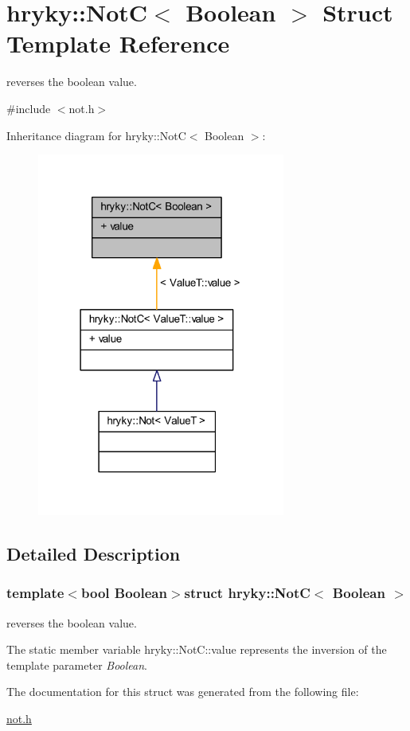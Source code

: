 \hypertarget{structhryky_1_1_not_c}{\section{hryky\-:\-:Not\-C$<$ Boolean $>$ Struct Template Reference}
\label{structhryky_1_1_not_c}
}


reverses the boolean value.  




{\ttfamily \#include $<$not.\-h$>$}



Inheritance diagram for hryky\-:\-:Not\-C$<$ Boolean $>$\-:\nopagebreak
\begin{figure}[H]
\begin{center}
\leavevmode
\includegraphics[width=231pt]{structhryky_1_1_not_c__inherit__graph}
\end{center}
\end{figure}


\subsection{Detailed Description}
\subsubsection*{template$<$bool Boolean$>$struct hryky\-::\-Not\-C$<$ Boolean $>$}

reverses the boolean value. 


\begin{DoxyItemize}
\item The static member variable hryky\-::\-Not\-C\-::value represents the inversion of the template parameter {\itshape Boolean\/}. 
\end{DoxyItemize}

The documentation for this struct was generated from the following file\-:\begin{DoxyCompactItemize}
\item 
\hyperlink{not_8h}{not.\-h}\end{DoxyCompactItemize}
